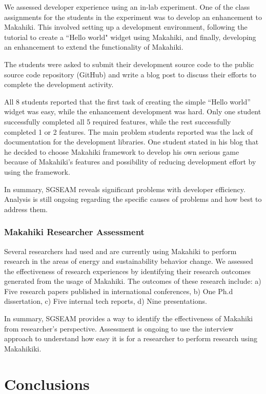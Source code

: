 \documentclass{sigchi}
\begin{document}
We assessed developer experience using an in-lab experiment. One of the class assignments
for the students in the experiment was to develop an enhancement to Makahiki.  This
involved setting up a development environment, following the tutorial to create a ``Hello
world" widget using Makahiki, and finally, developing an enhancement to extend the
functionality of Makahiki.

The students were asked to submit their development source code to the
public source code repository (GitHub) and write a blog post to
discuss their efforts to complete the development activity.

All 8 students reported that the first task of creating the simple ``Hello world'' widget
was easy, while the enhancement development was hard. Only one student successfully
completed all 5 required features, while the rest successfully completed 1 or 2
features. The main problem students reported was the lack of documentation for the
development libraries. One student stated in his blog that he decided to choose Makahiki
framework to develop his own serious game because of Makahiki's features and possibility
of reducing development effort by using the framework.

In summary, SGSEAM reveals significant problems with developer efficiency.
Analysis is still ongoing regarding the specific causes of problems and how best to
address them.

\subsubsection{Makahiki Researcher Assessment}

Several researchers had used and are currently using Makahiki to perform
research in the areas of energy and sustainability behavior change. We assessed the effectiveness
of research experiences by identifying their research outcomes generated from the usage of Makahiki.
The outcomes of these research include: a) Five research papers published in international
conferences, b) One Ph.d dissertation, c) Five internal tech reports, d) Nine presentations.

In summary, SGSEAM provides a way to identify the effectiveness of Makahiki from researcher's
perspective. Assessment is ongoing to use the interview approach to understand how easy it is for
a researcher to perform research using Makahikiki.

\section{Conclusions}
\end{document}
